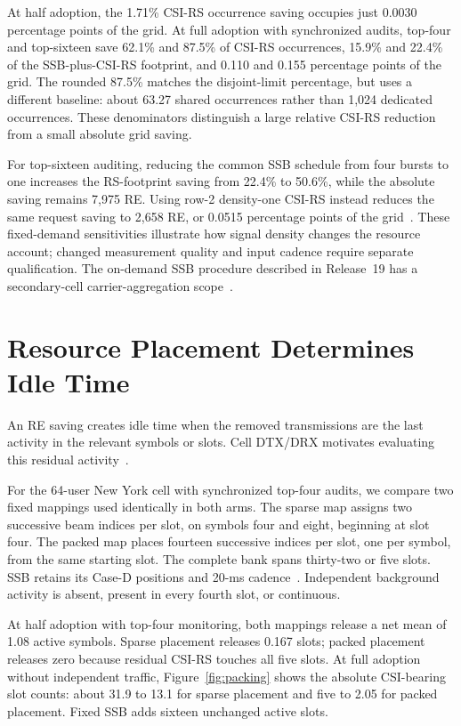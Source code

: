 \documentclass[journal,10pt]{IEEEtran}
\begin{document}
At half adoption, the 1.71\% CSI-RS occurrence saving occupies just 0.0030 percentage points of the grid. At full adoption with synchronized audits, top-four and top-sixteen save 62.1\% and 87.5\% of CSI-RS occurrences, 15.9\% and 22.4\% of the SSB-plus-CSI-RS footprint, and 0.110 and 0.155 percentage points of the grid. The rounded 87.5\% matches the disjoint-limit percentage, but uses a different baseline: about 63.27 shared occurrences rather than 1,024 dedicated occurrences. These denominators distinguish a large relative CSI-RS reduction from a small absolute grid saving.

For top-sixteen auditing, reducing the common SSB schedule from four bursts to one increases the RS-footprint saving from 22.4\% to 50.6\%, while the absolute saving remains 7,975 RE. Using row-2 density-one CSI-RS instead reduces the same request saving to 2,658 RE, or 0.0515 percentage points of the grid~\cite{ts38211}. These fixed-demand sensitivities illustrate how signal density changes the resource account; changed measurement quality and input cadence require separate qualification. The on-demand SSB procedure described in Release~19 has a secondary-cell carrier-aggregation scope~\cite{ts38300}.

\section{Resource Placement Determines Idle Time}
An RE saving creates idle time when the removed transmissions are the last activity in the relevant symbols or slots. Cell DTX/DRX motivates evaluating this residual activity~\cite{ts38300}.

For the 64-user New York cell with synchronized top-four audits, we compare two fixed mappings used identically in both arms. The sparse map assigns two successive beam indices per slot, on symbols four and eight, beginning at slot four. The packed map places fourteen successive indices per slot, one per symbol, from the same starting slot. The complete bank spans thirty-two or five slots. SSB retains its Case-D positions and 20-ms cadence~\cite{ts38213}. Independent background activity is absent, present in every fourth slot, or continuous.

At half adoption with top-four monitoring, both mappings release a net mean of 1.08 active symbols. Sparse placement releases 0.167 slots; packed placement releases zero because residual CSI-RS touches all five slots. At full adoption without independent traffic, Figure~\ref{fig:packing} shows the absolute CSI-bearing slot counts: about 31.9 to 13.1 for sparse placement and five to 2.05 for packed placement. Fixed SSB adds sixteen unchanged active slots.
\end{document}
